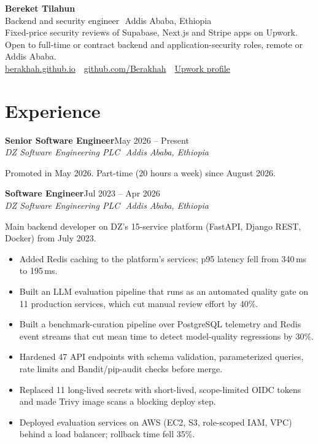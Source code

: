 \documentclass[10pt,letterpaper]{article}
\newcommand{\sep}{\,\textperiodcentered\,}
\newcommand{\role}[3]{%
  \textbf{#1}\hfill{\small #2}\\
  {\small\itshape #3}\par\vspace{1pt}}
\newcommand{\note}[1]{{\small #1}\par}
\begin{document}
\fontsize{9.5}{11.1}\selectfont

\begin{center}
  {\LARGE\bfseries\color{accent} Bereket Tilahun}\\[2pt]
  {\large Backend and security engineer \sep Addis Ababa, Ethiopia}\\[1pt]
  {\small Fixed-price security reviews of Supabase, Next.js and Stripe apps on Upwork. Open to full-time or
  contract backend and application-security roles, remote or Addis Ababa.}\\[1pt]
  {\small
  \href{https://berakhah.github.io}{berakhah.github.io} \sep
  \href{https://github.com/Berakhah}{github.com/Berakhah} \sep
  \href{https://upwork.com/freelancers/~01645da719eb4829ed}{Upwork profile}}
\end{center}
\vspace{-8pt}

\section{Experience}

\role{Senior Software Engineer}{May 2026 -- Present}{DZ Software Engineering PLC \sep Addis Ababa, Ethiopia}
\note{Promoted in May 2026. Part-time (20 hours a week) since August 2026.}
\vspace{2pt}

\role{Software Engineer}{Jul 2023 -- Apr 2026}{DZ Software Engineering PLC \sep Addis Ababa, Ethiopia}
\note{Main backend developer on DZ's 15-service platform (FastAPI, Django REST, Docker) from July 2023.}
\begin{itemize}
  \item Added Redis caching to the platform's services; p95 latency fell from 340\,ms to 195\,ms.
  \item Built an LLM evaluation pipeline that runs as an automated quality gate on 11 production services,
  which cut manual review effort by 40\%.
  \item Built a benchmark-curation pipeline over PostgreSQL telemetry and Redis event streams that cut mean
  time to detect model-quality regressions by 30\%.
  \item Hardened 47 API endpoints with schema validation, parameterized queries, rate limits and
  Bandit/pip-audit checks before merge.
  \item Replaced 11 long-lived secrets with short-lived, scope-limited OIDC tokens and made Trivy image
  scans a blocking deploy step.
  \item Deployed evaluation services on AWS (EC2, S3, role-scoped IAM, VPC) behind a load balancer;
  rollback time fell 35\%.
\end{itemize}
\vspace{1pt}
\end{document}
